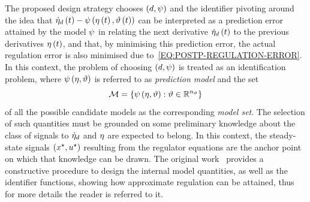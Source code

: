 The proposed design strategy chooses $\left( d, \psi \right)$ and the identifier pivoting around the idea that $\dot{\eta}_d \left( t \right) - \psi \left( \eta \left( t \right), \vartheta \left( t \right) \right)$
can be interpreted as a prediction error attained by the model $\psi$ in relating the next derivative $\dot{\eta}_d \left( t \right)$
to the previous derivatives $\eta \left( t \right)$, and that, by minimising this prediction error, the actual regulation error is also minimised due to~\eqref{EQ:POSTP-REGULATION-ERROR}.
In this context, the problem of choosing $\left( d, \psi \right)$ is treated as an identification problem, where $\psi \left( \eta, \vartheta \right)$
is referred to as \emph{prediction model} and the set
\begin{equation*}
   \mathcal{M} = \left\{ \psi \left( \eta, \vartheta \right) : \vartheta \in \mathbb{R}^{n_{\vartheta}} \right\}
\end{equation*}
of all the possible candidate models as the corresponding \emph{model set}.
The selection of such quantities must be grounded on some preliminary knowledge about the class of signals to
$\dot{\eta}_d$ and $\eta$ are expected to belong. In this context, the steady-state signals $\left( x^{\star}, u^{\star} \right)$
resulting from the regulator equations are the anchor point on which that knowledge can be drawn.
The original work~\cite{bin2019class} provides a constructive procedure to design the internal model quantities,
as well as the identifier functions, showing how approximate
regulation can be attained, thus for more details the reader is referred to it.

